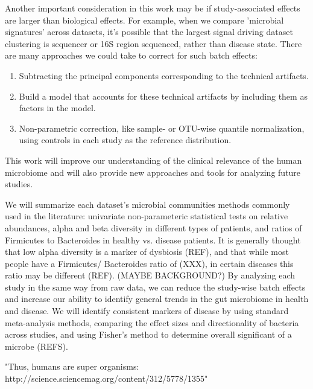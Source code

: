 \documentclass[12pt]{article}
\begin{document}
Another important consideration in this work may be if study-associated effects are larger than biological effects. For example, when we compare 'microbial signatures' across datasets, it's possible that the largest signal driving dataset clustering is sequencer or 16S region sequenced, rather than disease state. There are many approaches we could take to correct for such batch effects:
\begin{enumerate}
	\item Subtracting the principal components corresponding to the technical artifacts.
	\item Build a model that accounts for these technical artifacts by including them as factors in the model.
	\item Non-parametric correction, like sample- or OTU-wise quantile normalization, using controls in each study as the reference distribution.
\end{enumerate}

This work will improve our 
understanding of the clinical relevance of the human microbiome and 
will also provide new approaches and tools for analyzing future 
studies.

We will summarize each dataset's microbial communities
methods commonly used in the 
literature: univariate non-parameteric statistical tests on relative 
abundances, alpha and beta diversity in different types of patients, 
and ratios of Firmicutes to Bacteroides in healthy vs. disease 
patients. It is generally thought that low alpha diversity is a marker 
of dysbiosis (REF), and that while most people have a Firmicutes/
Bacteroides ratio of (XXX), in certain diseases this ratio may be 
different (REF). (MAYBE BACKGROUND?) By analyzing each study in the 
same way from raw data, we can reduce the study-wise batch effects and 
increase our ability to identify general trends in the gut microbiome 
in health and disease. We will identify consistent markers of disease 
by using standard meta-analysis methods, comparing the effect sizes 
and directionality of bacteria across studies, and using Fisher's 
method to determine overall significant of a microbe (REFS). 

"Thus, humans are super organisms: http://science.sciencemag.org/content/312/5778/1355"




\end{document}
